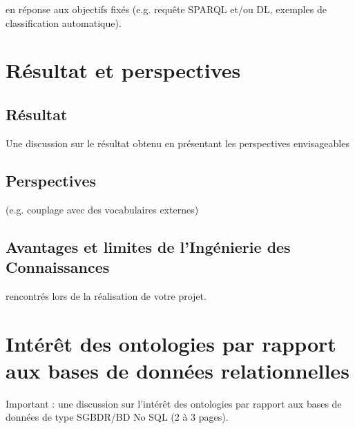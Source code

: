 \documentclass[oneside,13pt,a4paper]{article}
\begin{document}
en réponse aux objectifs fixés (e.g. requête SPARQL
et/ou DL, exemples de classification automatique).

\section{Résultat et perspectives}

\subsection{Résultat}

Une discussion sur le résultat obtenu en présentant les perspectives envisageables

\subsection{Perspectives}

(e.g. couplage avec des vocabulaires externes)

\subsection{Avantages et limites de l’Ingénierie des Connaissances}

rencontrés lors de la réalisation de votre projet.

\section{Intérêt des ontologies par rapport aux bases de données relationnelles}

Important : une discussion sur l’intérêt des ontologies par rapport aux bases de données de
type SGBDR/BD No SQL (2 à 3 pages).
\end{document}
